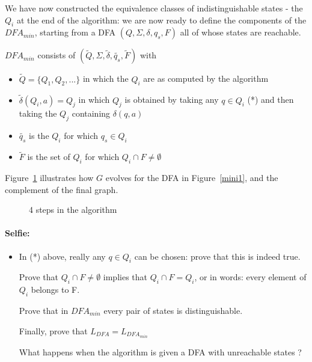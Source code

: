 We have now constructed the equivalence classes of indistinguishable
states - the $Q_i$ at the end of the algorithm: we are now ready to
define the components of the $DFA_{min}$, starting from a DFA
$(Q,\Sigma,\delta,q_s,F)$ all of whose states are reachable.

$DFA_{min}$ consists of
$(\tilde{Q},\Sigma,\tilde{\delta},\tilde{q_s},\tilde{F})$
with
\begin{itemize}
\item $\tilde{Q} = \{Q_1, Q_2, ...\}$ in which the $Q_i$ are as
  computed by the algorithm

\item
$\tilde{\delta}(Q_i,a) = Q_j$ in which $Q_j$ is obtained by taking any
  $q \in Q_i$ (*) and then taking the $Q_j$ containing $\delta(q,a)$

\item
$\tilde{q_s}$ is the $Q_i$ for which $q_s \in Q_i$

\item
$\tilde{F}$ is the set of $Q_i$ for which $Q_i \cap F \neq \emptyset$
\end{itemize}

Figure~\ref{minim1} illustrates how $G$ evolves for the DFA in
Figure~\ref{mini1}, and the complement of the final graph.
\begin{figure}[h]
\caption{ 4 steps in the algorithm\label{minim1}}
\end{figure}
\paragraph{Selfie:}
\begin{itemize}
\item[]
In (*) above, really any $q \in Q_i$ can be chosen: prove that this is
indeed true.

Prove that $Q_i \cap F \neq \emptyset$ implies that $Q_i \cap F =
Q_i$, or in words: every element of $Q_i$ belongs to F.

Prove that in $DFA_{min}$ every pair of states is distinguishable.

Finally, prove that $L_{DFA} = L_{DFA_{min}}$

What happens when the algorithm is given a DFA with unreachable states
?
\end{itemize}

